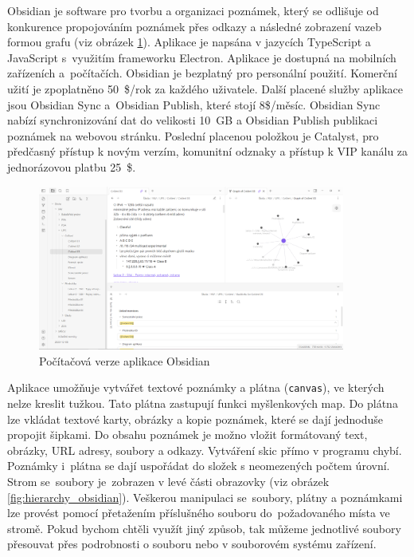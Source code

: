 \documentclass[czech, bc, kiv, he, iso690numb]{fasthesis}
\begin{document}
Obsidian je software pro tvorbu a organizaci poznámek, který se odlišuje od konkurence propojováním poznámek přes odkazy a následné zobrazení vazeb formou grafu (viz obrázek \ref{fig:obsidian_pc}). Aplikace je napsána v jazycích TypeScript a JavaScript s~využitím frameworku Electron. Aplikace je dostupná na mobilních zařízeních a~počítačích. Obsidian je bezplatný pro personální použití. Komerční užití je zpoplatněno 50~\$/rok za každého uživatele. Další placené služby aplikace jsou Obsidian Sync a~Obsidian Publish, které stojí 8\$/měsíc. Obsidian Sync nabízí synchronizování dat do velikosti 10~GB a Obsidian Publish publikaci poznámek na webovou stránku. Poslední placenou položkou je Catalyst, pro předčasný přístup k novým verzím, komunitní odznaky a přístup k VIP kanálu za jednorázovou platbu 25~\$. \cite{obsidian-website}

\begin{figure}[h!]
  \centering
  \includegraphics[width=0.90\textwidth]{img/BP-Runt/Obsidian/obsidian_PC2.PNG}
  \caption{Počítačová verze aplikace Obsidian}
  \label{fig:obsidian_pc}
\end{figure}

Aplikace umožňuje vytvářet textové poznámky a plátna (\texttt{canvas}), ve kterých nelze kreslit tužkou. Tato plátna zastupují funkci myšlenkových map. Do plátna lze vkládat textové karty, obrázky a kopie poznámek, které se dají jednoduše propojit šipkami. Do obsahu poznámek je možno vložit formátovaný text, obrázky, \gls{URL} adresy, soubory a odkazy. Vytváření skic přímo v programu chybí. Poznámky i~plátna se dají uspořádat do složek s neomezených počtem úrovní. Strom se~soubory je~zobrazen v levé části obrazovky (viz obrázek \ref{fig:hierarchy_obsidian}). Veškerou manipulaci se~soubory, plátny a poznámkami lze provést pomocí přetažením příslušného souboru do~požadovaného místa ve stromě. Pokud bychom chtěli využít jiný způsob, tak můžeme jednotlivé soubory přesouvat přes podrobnosti o souboru nebo v souborovém systému zařízení.
\end{document}
